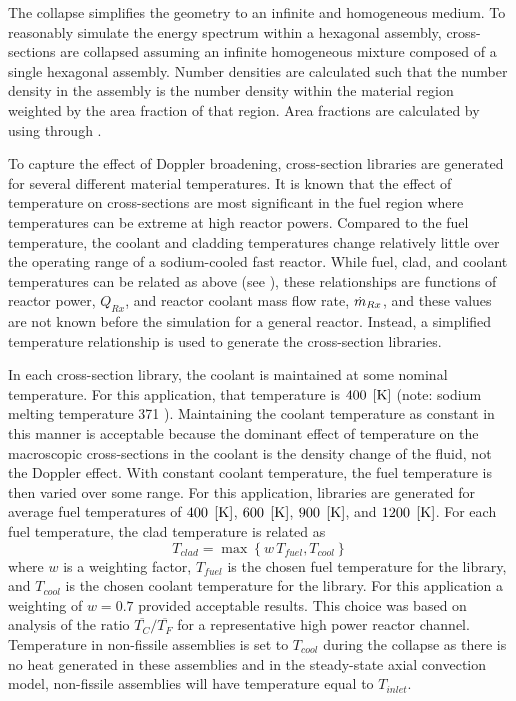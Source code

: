     The collapse simplifies the geometry to an infinite and homogeneous medium.
    To reasonably simulate the energy spectrum within a hexagonal assembly,
    cross-sections are collapsed assuming an infinite homogeneous mixture 
    composed of a single hexagonal assembly. Number densities are calculated 
    such that the number density in the assembly is the number density within
    the material region weighted by the area fraction of that region. Area
    fractions are calculated by using  through 
    .
    
    To capture the effect of Doppler broadening, cross-section libraries are
    generated for several different material temperatures.
    It is known that the effect of temperature on cross-sections are most
    significant in the fuel region where temperatures can be extreme at high
    reactor powers. Compared to the fuel temperature, the coolant and cladding
    temperatures change relatively little over the operating range of a
    sodium-cooled fast reactor.
    While fuel, clad, and coolant temperatures can be related as above (see
    ), these
    relationships are functions of reactor power, $Q_{Rx}$, and reactor 
    coolant mass flow rate, $\dot{m}_{Rx}$, and these values are not known before 
    the simulation for a general reactor. Instead, a simplified temperature 
    relationship is used to generate the cross-section libraries.

    In each cross-section library, the coolant is maintained at some nominal
    temperature. For this application, that temperature is $400 \;\left[\text{{K}}\right]$
    (note: sodium melting temperature 371 ). Maintaining the coolant
    temperature as constant in this manner
    is acceptable because the dominant effect of temperature on the macroscopic
    cross-sections in the coolant is the density change of the fluid, not the
    Doppler effect. With constant coolant temperature, the fuel temperature is
    then varied over some range. For this application, libraries are generated
    for average fuel temperatures of 
    $400 \;\left[\text{{K}}\right]$, $600 \;\left[\text{{K}}\right]$, $900 \;\left[\text{{K}}\right]$, and $1200 \;\left[\text{{K}}\right]$. For
    each fuel temperature, the clad temperature is related as 
    \begin{equation}
      T_{clad} = \max \left\{ w \, T_{fuel}, T_{cool} \right\}
    \end{equation}
    where $w$ is a weighting factor, $T_{fuel}$ is the chosen fuel temperature
    for the library, and $T_{cool}$ is the chosen coolant temperature for the
    library. For this 
    application a weighting of $w=0.7$ provided acceptable results. This choice
    was based on analysis of the ratio $\overline{T_C}/\overline{T_F}$ for a
    representative high power reactor channel. Temperature
    in non-fissile assemblies is set to $T_{cool}$ during the collapse as there
    is no heat generated in these assemblies and in the steady-state axial
    convection model, non-fissile assemblies will have temperature equal to 
    $T_{inlet}$.

